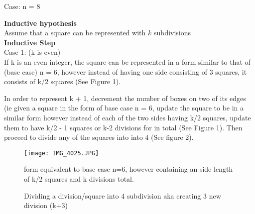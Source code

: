 \documentclass[solution,letterpaper]{cs20}
\begin{document}
\begin{problem}
\begin{solution}
            Case: n = 8 \\

            \textbf{Inductive hypothesis} \\
            Assume that a square can be represented with $k$ subdivisions \\

            \textbf{Inductive Step} \\
            Case 1: (k is even) \\
            If k is an even integer, the square can be represented in a form similar to that of (base case) n = 6, however instead of having one side consisting of 3 squares, it consists of k/2 squares (See Figure 1).

            In order to represent k + 1, decrement the number of boxes on two of its edges (ie given a square in the form of base case n = 6, update the square to be in a similar form however instead of each of the two sides having k/2 squares, update them to have k/2 - 1 squares or k-2 divisions for in total (See Figure 1). Then proceed to divide any of the squares into into 4 (See figure 2).

            \begin{figure}[H]
                \centering
                \texttt{[image: IMG\_4025.JPG]}
                \caption{form equivalent to base case n=6, however containing an side length of k/2 squares and k divisions total. }
                \label{fig:enter-label}
            \end{figure}


            \begin{figure}[H]
                \centering
                \caption{Dividing a division/square into 4 subdivision aka creating 3 new division (k+3)}
            \end{figure}


\end{solution}
\end{problem}
\end{document}
